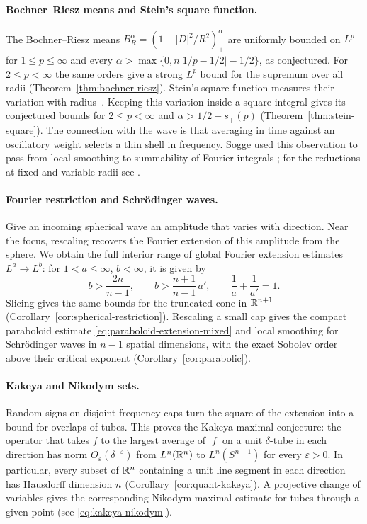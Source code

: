 \paragraph{Bochner--Riesz means and Stein's square function.}
The Bochner--Riesz means \(B_R^\alpha=(1-|D|^2/R^2)_+^\alpha\)
are uniformly bounded on \(L^p\) for \(1\le p\le\infty\) and every
\(\alpha>\max\{0,n|1/p-1/2|-1/2\}\), as conjectured. For
\(2\le p<\infty\) the same orders give a strong \(L^p\) bound for
the supremum over all radii (Theorem~\ref{thm:bochner-riesz}).
Stein's square function measures their variation with radius~\cite{Stein1958Square}.
Keeping this variation inside a square integral gives its conjectured
bounds for \(2\le p<\infty\) and \(\alpha>1/2+s_+(p)\)
(Theorem~\ref{thm:stein-square}).
The connection with the wave is that averaging in time against an
oscillatory weight selects a thin shell in frequency. Sogge used this
observation to pass from local smoothing to summability of Fourier
integrals \cite[Equations~(4.5)--(4.6)]{Sogge1991}; for the reductions
at fixed and variable radii see \cite[Propositions~39 and~40]{BHS2021}.

\paragraph{Fourier restriction and Schr\"odinger waves.}
Give an incoming spherical wave an amplitude that varies with
direction. Near the focus, rescaling recovers the Fourier extension
of this amplitude from the sphere. We obtain the full interior range
of global Fourier extension estimates \(L^a\to L^b\): for
\(1<a\le\infty\), \(b<\infty\), it is given by
\[
 b>\frac{2n}{n-1},\qquad b>\frac{n+1}{n-1}\,a',
       \qquad \frac1a+\frac1{a'}=1 .
\]
Slicing gives the same bounds for the truncated cone in \(\mathbb R^{n+1}\)
(Corollary~\ref{cor:spherical-restriction}). Rescaling a small cap
gives the compact paraboloid estimate \eqref{eq:paraboloid-extension-mixed}
and local smoothing for Schr\"odinger waves in \(n-1\) spatial dimensions,
with the exact Sobolev order above their critical exponent
(Corollary~\ref{cor:parabolic}).

\paragraph{Kakeya and Nikodym sets.}
Random signs on
disjoint frequency caps turn the square of the extension into a
bound for overlaps of tubes. This proves the Kakeya maximal
conjecture: the operator that takes \(f\) to the largest average of
\(|f|\) on a unit \(\delta\)-tube in each direction has norm
\(O_\varepsilon(\delta^{-\varepsilon})\) from \(L^n(\mathbb R^n)\) to
\(L^n(S^{n-1})\) for every \(\varepsilon>0\). In particular, every subset of \(\mathbb R^n\) containing
a unit line segment in each direction has Hausdorff dimension \(n\)
(Corollary~\ref{cor:quant-kakeya}). A projective change of variables
gives the corresponding Nikodym maximal estimate for tubes through a
given point (see \eqref{eq:kakeya-nikodym}).

